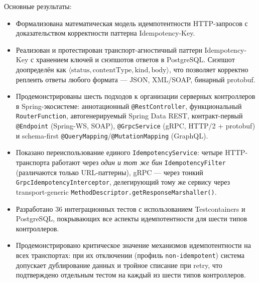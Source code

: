 Основные результаты:
\begin{itemize}
    \item Формализована математическая модель идемпотентности HTTP-запросов с доказательством корректности паттерна Idempotency-Key.
    \item Реализован и протестирован транспорт-агностичный паттерн Idempotency-Key с хранением ключей и снэпшотов ответов в PostgreSQL. Снэпшот доопределён как $\langle \text{status}, \text{contentType}, \text{kind}, \text{body} \rangle$, что позволяет корректно реплеить ответы любого формата --- JSON, XML/SOAP, бинарный protobuf.
    \item Продемонстрированы шесть подходов к организации серверных контроллеров в Spring-экосистеме: аннотационный \texttt{@RestController}, функциональный \texttt{RouterFunction}, автогенерируемый Spring Data REST, контракт-первый \texttt{@Endpoint} (Spring-WS, SOAP), \texttt{@GrpcService} (gRPC, HTTP/2 + protobuf) и schema-first \texttt{@QueryMapping}/\texttt{@MutationMapping} (GraphQL).
    \item Показано переиспользование единого \texttt{IdempotencyService}: четыре HTTP-транспорта работают через \emph{один и тот же бин} \texttt{IdempotencyFilter} (различаются только URL-паттерны), gRPC --- через тонкий \texttt{GrpcIdempotencyInterceptor}, делегирующий тому же сервису через transport-generic \texttt{MethodDescriptor.getResponseMarshaller()}.
    \item Разработано 36 интеграционных тестов с использованием Testcontainers и PostgreSQL, покрывающих все аспекты идемпотентности для шести типов контроллеров.
    \item Продемонстрировано критическое значение механизмов идемпотентности на всех транспортах: при их отключении (профиль \texttt{non-idempotent}) система допускает дублирование данных и тройное списание при retry, что подтверждено отдельным тестом на каждый из шести типов контроллеров.
\end{itemize}
